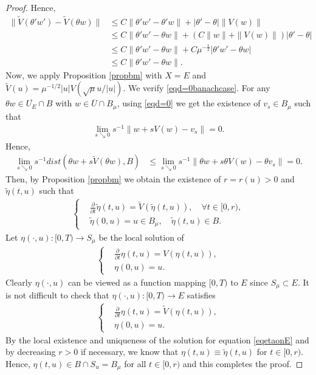 \documentclass[10pt,a4paper]{article}
\theoremstyle{definition} \theoremstyle{remark}
\numberwithin{equation}{section}
\begin{document}
\begin{proof}
    Hence,
    \begin{align*}
    	\|\widetilde{V}(\theta'w') - \widetilde{V}(\theta w)\| & \leq C\|\theta'w'-\theta'w\| + |\theta'-\theta|\|V(w)\| \\
    	& \leq C\|\theta'w'-\theta w\| + \left( C\|w\|+\|V(w)\|\right) |\theta'-\theta| \\
    	& \leq C\|\theta'w'-\theta w\|+C\mu^{-\frac12}|\theta'w'-\theta w| \\
    	& \leq C\|\theta'w'-\theta w\|.
    \end{align*}
    Now, we apply Proposition \ref{propbm} with $X = E$ and $\widetilde V(u) = \mu^{-1/2}|u|V(\sqrt \mu u/|u|)$. We verify \eqref{eqd=0banachcase}. For any $\theta w \in \overline{U_E} \cap B$ with $w \in \overline{U} \cap B_\mu$, using \eqref{eqd=0} we get the existence of $v_s \in B_\mu$ such that 
    \begin{align*}
    	\lim_{s \searrow 0}s^{-1}\|w + sV(w)-v_s\| = 0.
    \end{align*}
    Hence,
    \begin{align*}
    	\lim_{s \searrow 0}s^{-1}dist(\theta w + s\widetilde V(\theta w),B) & \leq \lim_{s \searrow 0}s^{-1}\|\theta w + s\theta V(w) - \theta v_s\| = 0.
    \end{align*}
    Then, by Proposition \ref{propbm} we obtain the existence of $r = r(u) > 0$ and $\tilde\eta(t,u)$ such that 
    \begin{align*}
    	\left\{
    	\begin{aligned}
    		& \frac{\partial}{\partial t}\tilde\eta(t,u) = \widetilde V(\tilde\eta(t,u)), \quad \forall t \in [0,r), \\
    		& \tilde\eta(0,u) = u \in B_\mu, \quad \tilde\eta(t,u) \in B.
    	\end{aligned}
    	\right.
    \end{align*}
    Let $\eta(\cdot,u): [0,T) \to S_\mu$ be the local solution of 
    \begin{align*}
    	\left\{
    	\begin{aligned}
    		& \frac{\partial}{\partial t}\eta(t,u) = V(\eta(t,u)), \\ 
    		& \eta(0,u) = u.
    	\end{aligned}
        \right.	
    \end{align*}
   Clearly $\eta(\cdot,u)$ can be viewed as a function mapping $[0,T)$ to $E$ since $S_\mu \subset E$. It is not difficult to check that $\eta(\cdot,u): [0,T) \to E$ satisfies
    \begin{align} \label{eqetaonE}
    	\left\{
    	\begin{aligned}
    		& \frac{\partial}{\partial t}\eta(t,u) = \widetilde V(\eta(t,u)), \\ 
    		& \eta(0,u) = u.
    	\end{aligned}
    	\right.	
    \end{align}
    By the local existence and uniqueness of the solution for equation \eqref{eqetaonE} and by decreasing $r >0$ if necessary, we know that $\eta(t,u) \equiv \tilde \eta(t,u)$ for $t \in [0,r)$. Hence, $\eta(t,u) \in B \cap S_u = B_\mu$ for all $t \in [0,r)$ and this completes the proof.
\end{proof}
\end{document}
